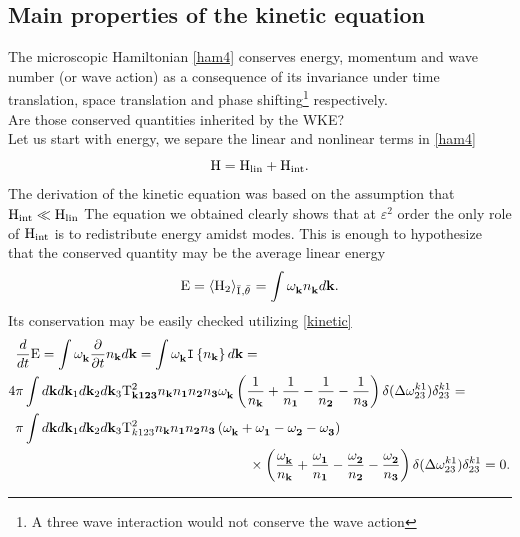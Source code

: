 \subsection{Main properties of the kinetic equation}

The microscopic Hamiltonian \eqref{ham4} conserves energy, momentum and wave number (or wave action) as a consequence of its invariance under time translation,
space translation and phase shifting\footnote{A three wave interaction would not conserve the wave action} respectively. \\
Are those conserved quantities inherited by the WKE?\\
Let us start with energy, we separe the linear and nonlinear terms in \eqref{ham4}
\begin{equation}
    \mathrm{H} = \mathrm{H}_{\text{lin}} + \mathrm{H}_{\text{int}}.
\end{equation}
The derivation of the kinetic equation was based on the assumption that $\mathrm{H}_{\text{int}} \ll \mathrm{H}_{\text{lin}}$ The equation we obtained clearly 
shows that at $\varepsilon^2$ 
order the only role of $\mathrm{H}_{\text{int}}$ is to redistribute energy amidst modes. This is enough to hypothesize that the conserved quantity may be the 
average linear energy
\begin{equation}
    \mathrm{E} = \left\langle \mathrm{H}_2 \right\rangle_{\bar{\mathrm{I}^{}},\bar{\theta}^{}} = \int \omega^{}_{\mathbf{k}} n^{}_\mathbf{k} d\mathbf{k}.
\end{equation}
Its conservation may be easily checked utilizing \eqref{kinetic} 
\begin{align}
    &\dt \Ewav = \int \omga_{\mathbf{k}} \pt n_\mathbf{k} d\mathbf{k} = \int \omga_{\mathbf{k}} \coll d\mathbf{k} = \label{encons}\\
    4 &\pi\int  d\mathbf{k} d\mathbf{k}_1 d\mathbf{k}_2 d\mathbf{k}_3 
    \Tint^2_\mathbf{k123}n_\mathbf{k}n_\mathbf{1}n_\mathbf{2}n_\mathbf{3} \omga_{\mathbf{k}}
    \left(\frac{1}{n_\mathbf{k}} + \frac{1}{n_\mathbf{1}} - \frac{1}{n_\mathbf{2}}- \frac{1}{n_\mathbf{3}}  \right)
    \delta(\delomega^{k1}_{23})\delta^{k1}_{23} = \\
    &\pi\int  d\mathbf{k} d\mathbf{k}_1 d\mathbf{k}_2 d\mathbf{k}_3 
    \Tint^2_{k123}n_\mathbf{k}n_\mathbf{1}n_\mathbf{2}n_\mathbf{3} \left(\omga_{\mathbf{k}} + \omga_\mathbf{1} - \omga_\mathbf{2} - \omga_\mathbf{3}\right) \\
    & \hspace{6cm}\times\left(\frac{\omga_{\mathbf{k}}}{n_\mathbf{k}} + \frac{\omga_\mathbf{1}}{n_\mathbf{1}} - 
    \frac{\omga_{\mathbf{2}}}{n_\mathbf{2}}- \frac{\omga_{\mathbf{2}}}{n_\mathbf{3}}  \right)
    \delta(\delomega^{k1}_{23})\delta^{k1}_{23} = 0.    
\end{align}
